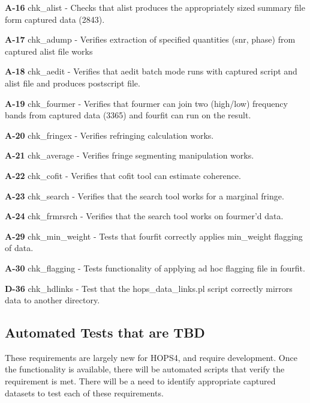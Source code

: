 \begin{description}

\item{\textbf{A-16}} chk\_alist - Checks that alist produces the appropriately sized summary file form captured data (2843).
\item{\textbf{A-17}} chk\_adump - Verifies extraction of specified quantities (snr, phase) from captured alist file works
\item{\textbf{A-18}} chk\_aedit - Verifies that aedit batch mode runs with captured script and alist file and produces postscript file.
\item{\textbf{A-19}} chk\_fourmer - Verifies that fourmer can join two (high/low) frequency bands from captured data (3365) and fourfit can run on the result.
\item{\textbf{A-20}} chk\_fringex -  Verifies refringing calculation works.
\item{\textbf{A-21}} chk\_average - Verifies fringe segmenting manipulation works.
\item{\textbf{A-22}} chk\_cofit - Verifies that cofit tool can estimate coherence.
\item{\textbf{A-23}} chk\_search - Verifies that the search tool works for a marginal fringe.
\item{\textbf{A-24}} chk\_frmrsrch -  Verifies that the search tool works on fourmer'd data.
\item{\textbf{A-29}} chk\_min\_weight - Tests that fourfit correctly applies min_weight flagging of data.
\item{\textbf{A-30}} chk\_flagging - Tests functionality of applying ad hoc flagging file in fourfit.
\item{\textbf{D-36}} chk\_hdlinks - Test that the hops\_data\_links.pl script correctly mirrors data to another directory.
\end{description}
  


\subsection{Automated Tests that are TBD}
\label{sec:regress3}

These requirements are largely new for HOPS4, and require development. Once the functionality is available, there will be automated scripts that verify the requirement is met.
There will be a need to identify appropriate captured datasets to test each of these requirements.

